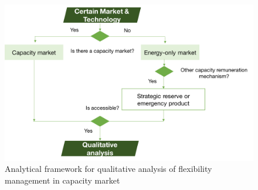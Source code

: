 \begin{figure}[h!]
	\centering
	\includegraphics[width=0.95\linewidth]{Figures/Q_capacity}
	\caption{Analytical framework for qualitative analysis of flexibility management in capacity market}
	\label{fig:qualitative-capacity}
\end{figure}

